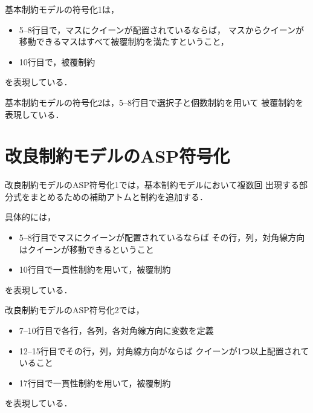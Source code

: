 

基本制約モデルの符号化1は，
\begin{itemize}
 \item 5--8行目で，マスにクイーンが配置されているならば，
  マスからクイーンが移動できるマスはすべて被覆制約を満たすということ，
 \item 10行目で，被覆制約
\end{itemize}
を表現している．




基本制約モデルの符号化2は，5--8行目で選択子と個数制約を用いて
被覆制約を表現している．
\newpage
\section{改良制約モデルのASP符号化}


改良制約モデルのASP符号化1では，基本制約モデルにおいて複数回
出現する部分式をまとめるための補助アトムと制約を追加する．

具体的には，
\begin{itemize}
  \item 5--8行目でマスにクイーンが配置されているならば
    その行，列，対角線方向はクイーンが移動できるということ
  \item 10行目で一貫性制約を用いて，被覆制約
\end{itemize}
を表現している．



\newpage
改良制約モデルのASP符号化2では，
\begin{itemize}
 \item 7--10行目で各行，各列，各対角線方向に変数を定義
 \item 12--15行目でその行，列，対角線方向がならば
  クイーンが1つ以上配置されていること
 \item 17行目で一貫性制約を用いて，被覆制約
\end{itemize}
を表現している．

